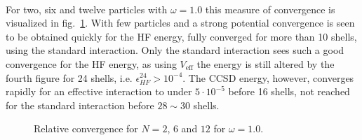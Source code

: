 \paragraph{}
For two, six and twelve particles with $\omega = 1.0$ this measure of convergence is visualized in fig.~\ref{fig:results:convN2OM1}.
With few particles and a strong potential convergence is seen to be obtained quickly for the HF energy, fully converged for more than 10 shells, using the standard interaction.
Only the standard interaction sees such a good convergence for the HF energy, as using $V_{\textrm{eff}}$ the energy is still altered by the fourth figure for 24 shells, i.e. $\epsilon^{24}_{HF} >  10^{-4}$.
The CCSD energy, however, converges rapidly for an effective interaction to under $5\cdot 10^{-5}$ before 16 shells, not reached for the standard interaction before $28\sim 30$ shells.
\begin{figure}
\begin{center}
\caption{Relative convergence for $N=2$, $6$ and $12$ for $\omega =1.0$.}
\label{fig:results:convN2OM1}
\end{center}
\end{figure}

